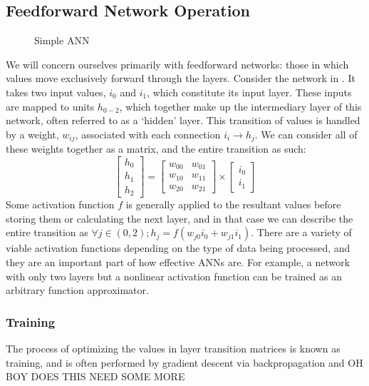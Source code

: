 \subsection{Feedforward Network Operation}
\begin{wrapfigure}[8]{l}{.35\textwidth}
	\centering
	\vspace{-12pt}
	{\scalebox{.9}{}}
	\caption{Simple ANN}
	\label{fig:ANN}
\end{wrapfigure}
We will concern ourselves primarily with feedforward networks: those in which 
values move exclusively forward through the layers.
Consider the network in . It takes two input values, $i_0$ and 
$i_1$, which constitute its input layer. These inputs are mapped to units 
$h_{0-2}$, which together make up the intermediary layer of this network, often 
referred to as a `hidden' layer.  This transition of values is handled by a 
weight, $w_{ij}$, associated with each connection $i_i \rightarrow h_j$. We can 
consider all of these weights together as a matrix, and the entire transition as 
such:
\begin{equation}
	\begin{bmatrix} h_0 \\ h_1 \\ h_2 \end{bmatrix} = \begin{bmatrix}
w_{00} & w_{01}\\ w_{10} & w_{11}\\ w_{20} & w_{21} \end{bmatrix} \times 
\begin{bmatrix} i_0 \\ i_1 \end{bmatrix}
\end{equation}
Some activation function $f$ is generally applied to the resultant values before 
storing them or calculating the next layer, and in that case we can describe the 
entire transition as $\forall j \in (0,2); h_j = f(w_{j0}i_0 + w_{j1}i_1)$.  
There are a variety of viable activation functions depending on the type of data 
being processed, and they are an important part of how effective ANNs are. For 
example, a network with only two layers but a nonlinear activation function can 
be trained as an arbitrary function approximator.\cite{2006mathematics}
\subsubsection{Training}
The process of optimizing the values in layer transition matrices is known as 
training, and is often performed by gradient descent via backpropagation and OH 
BOY DOES THIS NEED SOME MORE

